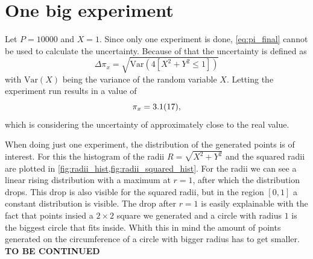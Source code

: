 \section{One big experiment}\label{sec:1}
Let $P = \num{10000}$ and $X = 1$. Since only one experiment is done,
\cref{eq:pi_final} cannot be used to calculate the uncertainty. Because of that
the uncertainty is defined as
\begin{equation}
	\Delta \pi_x = \sqrt{\text{Var}(4[X^2 + Y^2 \leq 1])}
    \label{eq:uncertainty_for_one_x}
\end{equation}
with $\text{Var}(X)$ being the variance of the random variable $X$.
Letting the experiment run results in a value of
\begin{equation}
	\pi_x = \num{3.1 \pm 1.7},
\end{equation}
which is considering the uncertainty of approximately  close to the real value.\par
%
When doing just one experiment, the distribution of the generated points is 
of interest. For this the histogram of the radii $R = \sqrt{X^2 + Y^2}$
and the squared radii are plotted in \cref{fig:radii_hist,fig:radii_squared_hist}.
For the radii we can see a linear rising distribution with a maximum at $r=1$, after which 
the distribution drops. This drop is also visible for the squared radii, but 
in the region $[0,1]$ a constant distribution is visible. The drop after 
$r=1$ is easily explainable with the fact that points insied a $2\times 2$ square
we generated and a circle with radius $1$ is the biggest circle that fits inside.
Whith this in mind the amount of points generated on the circumference of a 
circle with bigger radius has to get smaller.
\textbf{TO BE CONTINUED}


